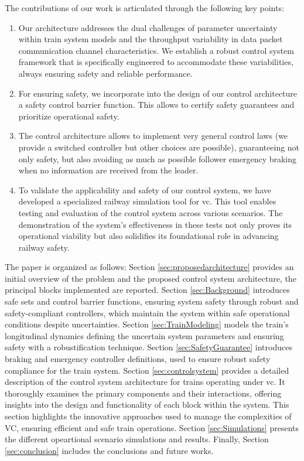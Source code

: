 \documentclass[letterpaper, 10 pt, conference]{ieeeconf}
\theoremstyle{definition}
\theoremstyle{nopoint}
\begin{document}
The contributions of our work is articulated through the following key points:

\begin{enumerate}
	
 \item Our architecture addresses the dual challenges of parameter uncertainty within train system models and the throughput variability in data packet communication channel characteristics. We establish a robust control system framework that is specifically engineered to accommodate these variabilities, always ensuring safety and reliable performance.


\item For ensuring safety, we incorporate into the design of our control architecture a safety control barrier function. This allows to certify safety guarantees and  prioritize operational safety.

\item The control architecture allows to implement very general control laws (we provide a switched controller but other choices are possible), guaranteeing not only safety, but also  avoiding as much as possible follower emergency braking when no information are received from the leader.

\item To validate the applicability and safety of our control system, we have developed a specialized railway simulation tool for \gls{vc}. This tool enables testing and evaluation of the control system across various scenarios. The demonstration of the system's effectiveness in these tests not only proves its operational viability but also solidifies its foundational role in advancing railway safety.
\end{enumerate}
%
The paper is organized as follows: Section \ref{sec:proposedarchitecture} provides an initial overview of the problem and the proposed control system architecture, the principal blocks implemented are reported. Section \ref{sec:Background} introduces safe sets and control barrier functions, ensuring system safety through robust and safety-compliant controllers, which maintain the system within safe operational conditions despite uncertainties. Section \ref{sec:TrainModeling} models the train's longitudinal dynamics defining the uncertain system parameters and ensuring safety with a robustification technique.
  Section \ref{sec:SafetyGuarantee} introduces braking and emergency controller definitions, used to ensure robust safety compliance for the train system.
  Section \ref{sec:controlsystem} provides a detailed description of the control system architecture for trains operating under \gls{vc}. It thoroughly examines the primary components and their interactions, offering insights into the design and functionality of each block within the system. This section highlights the innovative approaches used to manage the complexities of VC, ensuring efficient and safe train operations. Section \ref{sec:Simulations} presents the different opeartional scenario simulations
  and results. Finally, Section \ref{sec:conclusion} includes the conclusions and future works.
  
\end{document}
